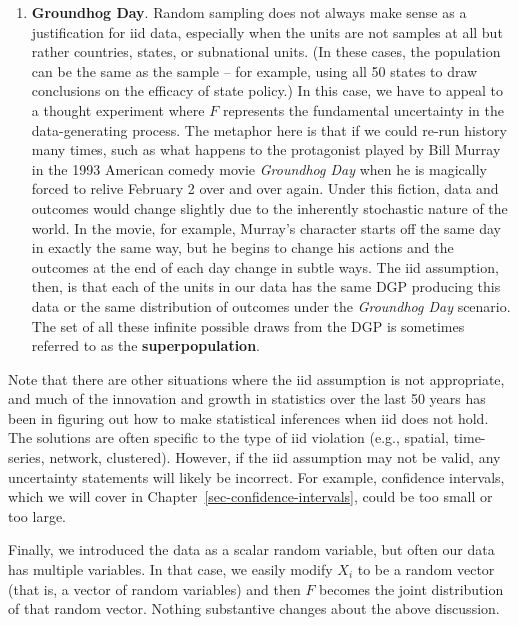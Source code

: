 \documentclass[
  13pt,
  letterpaper,
  DIV=11,
  numbers=noendperiod]{scrreprt}
\providecommand{\tightlist}{%
  \setlength{\itemsep}{0pt}\setlength{\parskip}{0pt}}
\theoremstyle{plain}
\theoremstyle{plain}
\theoremstyle{definition}
\theoremstyle{definition}
\theoremstyle{remark}
\begin{document}
\begin{enumerate}
\def\labelenumi{\arabic{enumi}.}
\setcounter{enumi}{1}
\tightlist
\item
  \textbf{Groundhog Day}. Random sampling does not always make sense as
  a justification for iid data, especially when the units are not
  samples at all but rather countries, states, or subnational units. (In
  these cases, the population can be the same as the sample -- for
  example, using all 50 states to draw conclusions on the efficacy of
  state policy.) In this case, we have to appeal to a thought experiment
  where \(F\) represents the fundamental uncertainty in the
  data-generating process. The metaphor here is that if we could re-run
  history many times, such as what happens to the protagonist played by
  Bill Murray in the 1993 American comedy movie \emph{Groundhog Day}
  when he is magically forced to relive February 2 over and over again.
  Under this fiction, data and outcomes would change slightly due to the
  inherently stochastic nature of the world. In the movie, for example,
  Murray's character starts off the same day in exactly the same way,
  but he begins to change his actions and the outcomes at the end of
  each day change in subtle ways. The iid assumption, then, is that each
  of the units in our data has the same DGP producing this data or the
  same distribution of outcomes under the \emph{Groundhog Day} scenario.
  The set of all these infinite possible draws from the DGP is sometimes
  referred to as the \textbf{superpopulation}.
\end{enumerate}

Note that there are other situations where the iid assumption is not
appropriate, and much of the innovation and growth in statistics over
the last 50 years has been in figuring out how to make statistical
inferences when iid does not hold. The solutions are often specific to
the type of iid violation (e.g., spatial, time-series, network,
clustered). However, if the iid assumption may not be valid, any
uncertainty statements will likely be incorrect. For example, confidence
intervals, which we will cover in
Chapter~\ref{sec-confidence-intervals}, could be too small or too large.

Finally, we introduced the data as a scalar random variable, but often
our data has multiple variables. In that case, we easily modify \(X_i\)
to be a random vector (that is, a vector of random variables) and then
\(F\) becomes the joint distribution of that random vector. Nothing
substantive changes about the above discussion.
\end{document}
